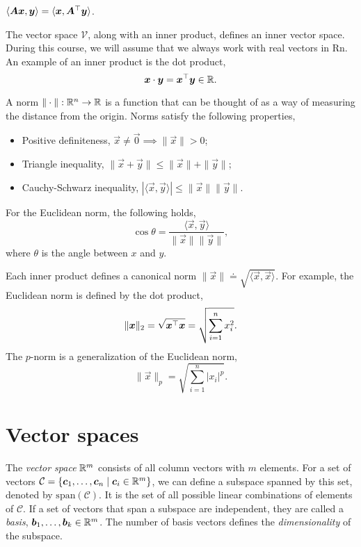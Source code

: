 \documentclass[justified,nobib]{tufte-handout}
\newcommand{\ang}[1]{\langle #1 \rangle}
\begin{document}
\begin{corollary}
    $\ang{\mat{A}\vec{x}, \vec{y}} = \ang{\vec{x}, \transpose{\mat{A}} \vec{y}}$.
\end{corollary}

The vector space $\mathcal{V}$, along with an inner product, defines an inner vector space. During
this course, we will assume that we always work with real vectors in Rn. An example of an inner
product is the dot product, \[
    \bm{x}\cdot \bm{y} = \bm{x}^\top \bm{y} \in \mathbb{R}.
\]

\begin{definition}[Norm]
    A norm $\|\cdot\|: \mathbb{R}^n \to \mathbb{R}$ is a function that can be thought of as a way of measuring the distance from the origin.
    Norms satisfy the following properties,
    \begin{itemize}
        \item Positive definiteness, $\vec{x} \neq \vec{0} \implies \|\vec{x}\| > 0$;
        \item Triangle inequality, $\|\vec{x}+\vec{y}\| \leq \|\vec{x}\| + \|\vec{y}\|$;
        \item Cauchy-Schwarz inequality, $|\ang{\vec{x},\vec{y}}| \leq \|\vec{x}\| \|\vec{y}\|$.
    \end{itemize}
\end{definition}

\begin{corollary}
    For the Euclidean norm, the following holds, \[
        \cos \theta = \frac{\ang{\vec{x},\vec{y}}}{\|\vec{x}\| \|\vec{y}\|},
    \]
    where $\theta$ is the angle between $x$ and $y$.
\end{corollary}

Each inner product defines a canonical norm $\|\vec{x}\| \doteq \sqrt{\ang{\vec{x},\vec{x}}}$. For
example, the Euclidean norm is defined by the dot product, \[
    \|\bm{x}\|_2 = \sqrt{\bm{x}^\top\bm{x}} = \sqrt{\sum_{i=1}^{n} x_i^2}.
\]
The $p$-norm is a generalization of the Euclidean norm, \[
    \|\vec{x}\|_p = \sqrt{\sum_{i=1}^{n} |x_i|^p}.
\]

\section{Vector spaces}

The \textit{vector space} $\mathbb{R}^m$ consists of all column vectors with $m$ elements. For a set of
vectors $\mathcal{C} = \{ \bm{c}_1,\ldots,\bm{c}_n \mid \bm{c}_i \in \mathbb{R}^m \}$, we can define a
subspace spanned by this set, denoted by $\mathrm{span}(\mathcal{C})$. It is the set of all
possible linear combinations of elements of $\mathcal{C}$. If a set of vectors that span a subspace
are independent, they are called a \textit{basis}, $\bm{b}_1,\ldots,\bm{b}_k \in \mathbb{R}^m$. The
number of basis vectors defines the \textit{dimensionality} of the subspace.
\end{document}
